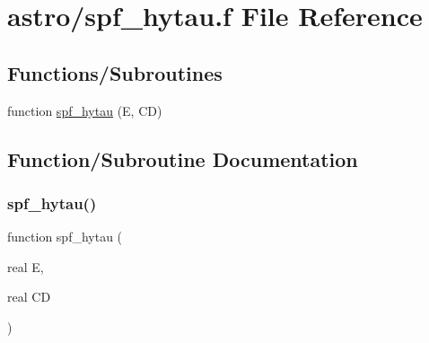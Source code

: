 \hypertarget{spf__hytau_8f}{}\section{astro/spf\+\_\+hytau.f File Reference}
\label{spf__hytau_8f}
\subsection*{Functions/\+Subroutines}
\begin{DoxyCompactItemize}
\item 
function \hyperlink{spf__hytau_8f_ab2a09ab4070d10054a3761b0b0f2caa4}{spf\+\_\+hytau} (E, CD)
\end{DoxyCompactItemize}


\subsection{Function/\+Subroutine Documentation}
\mbox{\label{spf__hytau_8f_ab2a09ab4070d10054a3761b0b0f2caa4}} 
\subsubsection{\texorpdfstring{spf\+\_\+hytau()}{spf\_hytau()}}
{\footnotesize\ttfamily function spf\+\_\+hytau (\begin{DoxyParamCaption}\item[{real}]{E,  }\item[{real}]{CD }\end{DoxyParamCaption})}

